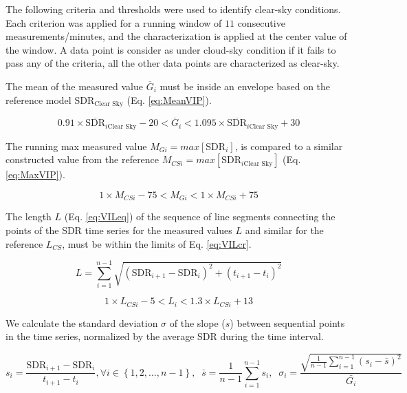 \documentclass[
  preprint, 3p, authoryear]{article}
\begin{document}
The following criteria and thresholds were used to identify clear-sky conditions.
Each criterion was applied for a running window of \(11\) consecutive measurements/minutes, and the characterization is applied at the center value of the window.
A data point is consider as under cloud-sky condition if it fails to pass any of the criteria, all the other data points are characterized as clear-sky.

The mean of the measured value \(\overline{G}_i\) must be inside an envelope based on the reference model \(\text{SDR}_\text{Clear Sky}\) (Eq. \ref{eq:MeanVIP}).

\begin{equation}
0.91 \times \overline{\text{SDR}}_{i\text{Clear Sky}} - 20
< \overline{G}_i <
1.095 \times \overline{\text{SDR}}_{i\text{Clear Sky}} + 30
\label{eq:MeanVIP}
\end{equation}

The running max measured value \(M_{Gi} = max[\text{SDR}_{i}]\), is compared to a similar constructed value from the reference \(M_{CSi} = max[\text{SDR}_{i\text{Clear Sky}}]\) (Eq. \ref{eq:MaxVIP}).

\begin{equation}
1 \times M_{CSi} - 75
< M_{Gi} <
1 \times M_{CSi} + 75
\label{eq:MaxVIP}
\end{equation}

The length \(L\) (Eq. \ref{eq:VILeq}) of the sequence of line segments connecting the points of the SDR time
series for the measured values \(L\) and similar for the reference \(L_{CS}\), must be within the limits of Eq. \ref{eq:VILcr}.

\begin{equation}
L = \sum_{i=1}^{n-1}\sqrt{\left ( \text{SDR}_{i+1} - \text{SDR}_{i}\right )^2 + \left ( t_{i+1} - t_i \right )^2}
\label{eq:VILeq}
\end{equation}

\begin{equation}
1 \times L_{CSi} - 5 < L_i < 1.3 \times L_{CSi} + 13
\label{eq:VILcr}
\end{equation}

We calculate the standard deviation \(\sigma\) of the slope
(\(s\)) between sequential points in the time series, normalized by the average SDR during the time interval.

\begin{equation}
s_i = \frac{\text{SDR}_{i+1} - \text{SDR}_{i}}{t_{i+1} - t_i}, \forall i \in \left \{ 1, 2, \ldots, n-1 \right \},\;\;
\bar{s} = \frac{1}{n-1} \sum_{i=1}^{n-1} s_i,\;\;
\sigma_i = \frac {\sqrt{\frac{1}{n-1} \sum_{i=1}^{n-1} \left( s_i - \bar{s} \right)^2} } {\bar{G_i}} \label{eq:VCT3b}
\end{equation}
\end{document}
